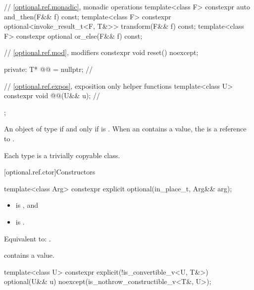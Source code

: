 \begin{codeblock}
{{    // \ref{optional.ref.monadic}, monadic operations
    template<class F> constexpr auto and_then(F&& f) const;
    template<class F> constexpr optional<invoke_result_t<F, T&>> transform(F&& f) const;
    template<class F> constexpr optional or_else(F&& f) const;

    // \ref{optional.ref.mod}, modifiers
    constexpr void reset() noexcept;

  private:
    T* @@ = nullptr;                                           // \expos

    // \ref{optional.ref.expos}, exposition only helper functions
    template<class U>
      constexpr void @@(U&& u);               // \expos
  };
}
\end{codeblock}

\pnum
An object of type 
if and only if  is .
When an  contains a value,
the 
is a reference to .

\pnum
Each type  is a trivially copyable class.

[optional.ref.ctor]{Constructors}

\begin{itemdecl}
template<class Arg>
  constexpr explicit optional(in_place_t, Arg&& arg);
\end{itemdecl}

\begin{itemdescr}
\pnum
\constraints
\begin{itemize}
\item {} is , and
\item {} is .
\end{itemize}

\pnum
\effects
Equivalent to: .

\pnum
\ensures
{} contains a value.
\end{itemdescr}

\begin{itemdecl}
template<class U>
  constexpr explicit(!is_convertible_v<U, T&>)
  optional(U&& u) noexcept(is_nothrow_constructible_v<T&, U>);
\end{itemdecl}

